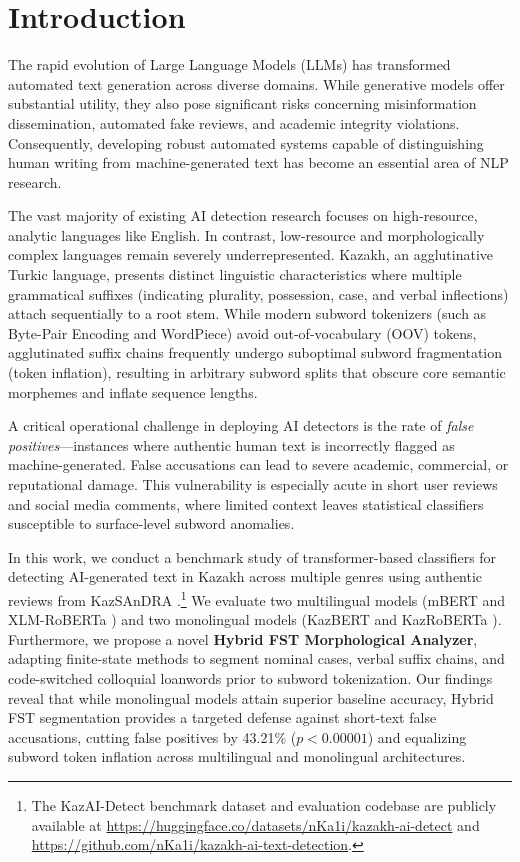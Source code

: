 \documentclass[runningheads]{llncs}
\begin{document}
\section{Introduction}
The rapid evolution of Large Language Models (LLMs) has transformed automated text generation across diverse domains. While generative models offer substantial utility, they also pose significant risks concerning misinformation dissemination, automated fake reviews, and academic integrity violations. Consequently, developing robust automated systems capable of distinguishing human writing from machine-generated text has become an essential area of NLP research.

The vast majority of existing AI detection research focuses on high-resource, analytic languages like English. In contrast, low-resource and morphologically complex languages remain severely underrepresented. Kazakh, an agglutinative Turkic language, presents distinct linguistic characteristics where multiple grammatical suffixes (indicating plurality, possession, case, and verbal inflections) attach sequentially to a root stem. While modern subword tokenizers (such as Byte-Pair Encoding and WordPiece) avoid out-of-vocabulary (OOV) tokens, agglutinated suffix chains frequently undergo suboptimal subword fragmentation (token inflation), resulting in arbitrary subword splits that obscure core semantic morphemes and inflate sequence lengths.

A critical operational challenge in deploying AI detectors is the rate of \textit{false positives}---instances where authentic human text is incorrectly flagged as machine-generated. False accusations can lead to severe academic, commercial, or reputational damage. This vulnerability is especially acute in short user reviews and social media comments, where limited context leaves statistical classifiers susceptible to surface-level subword anomalies.

In this work, we conduct a benchmark study of transformer-based classifiers for detecting AI-generated text in Kazakh across multiple genres using authentic reviews from KazSAnDRA \cite{1}.\footnote{The KazAI-Detect benchmark dataset and evaluation codebase are publicly available at \url{https://huggingface.co/datasets/nKa1i/kazakh-ai-detect} and \url{https://github.com/nKa1i/kazakh-ai-text-detection}.} We evaluate two multilingual models (mBERT \cite{2} and XLM-RoBERTa \cite{3}) and two monolingual models (KazBERT \cite{4} and KazRoBERTa \cite{5}). Furthermore, we propose a novel \textbf{Hybrid FST Morphological Analyzer}, adapting finite-state methods \cite{6} to segment nominal cases, verbal suffix chains, and code-switched colloquial loanwords prior to subword tokenization. Our findings reveal that while monolingual models attain superior baseline accuracy, Hybrid FST segmentation provides a targeted defense against short-text false accusations, cutting false positives by 43.21\% ($p < 0.00001$) and equalizing subword token inflation across multilingual and monolingual architectures.
\end{document}
